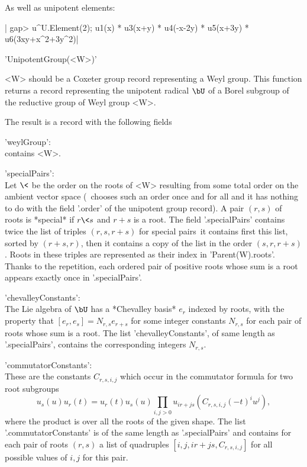 As well as unipotent elements:

|    gap> u^U.Element(2);
    u1(x) * u3(x+y) * u4(-x-2y) * u5(x+3y) * u6(3xy+x^2+3y^2)|
 

'UnipotentGroup(<W>)'

<W>  should  be  a  Coxeter  group  record  representing a Weyl group. This
function  returns a  record representing  the unipotent  radical $\bU$ of a
Borel subgroup of the reductive group of Weyl group <W>.

The result is a record with the following fields\:

'weylGroup':\\ contains <W>.

'specialPairs':\\  Let $\<$ be the order on  the roots of <W> resulting from
     some total order on the ambient vector space (\CHEVIE\ chooses such an
     order  once  and  for  all  and  it  has  nothing to do with the field
     '.order'  of the unipotent  group record). A  pair $(r,s)$ of roots is
     *special*  if $r\<s$  and $r+s$  is a  root. The field '.specialPairs'
     contains twice the list of triples $(r,s,r+s)$ for special pairs\:\ it
     contains first this list, sorted by $(r+s,r)$, then it contains a copy
     of  the  list  in  the  order  $(s,r,r+s)$. Roots in these triples are
     represented  as  their  index  in  'Parent(W).roots'.  Thanks to the
     repetition,  each ordered pair  of positive roots  whose sum is a root
     appears exactly once in '.specialPairs'.

'chevalleyConstants':\\  The Lie algebra of $\bU$ has a *Chevalley basis*
     $e_r$  indexed  by  roots,  with  the property that $[e_r,e_s]=N_{r,s}
     e_{r+s}$  for some integer constants $N_{r,s}$  for each pair of roots
     whose  sum is a root. The list 'chevalleyConstants', of same length as
     '.specialPairs', contains the corresponding integers $N_{r,s}$.

'commutatorConstants':\\  These are the constants $C_{r,s,i,j}$ which occur
     in the commutator formula for two root subgroups\:
     $$u_s(u)u_r(t)=u_r(t)u_s(u)\prod_{i,j>0}
     u_{ir+js}(C_{r,s,i,j}(-t)^iu^j),$$  where the product  is over all the
     roots  of the given  shape. The list  '.commutatorConstants' is of the
     same  length as  '.specialPairs' and  contains for  each pair of roots
     $(r,s)$   a  list  of  quadruples  $[i,j,ir+js,C_{r,s,i,j}]$  for  all
     possible values of $i,j$ for this pair.

